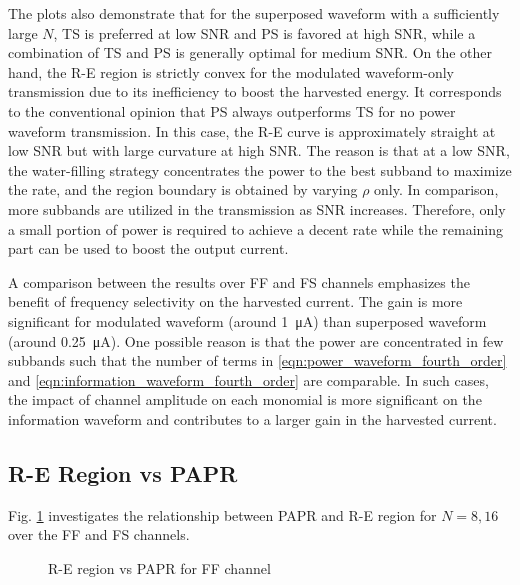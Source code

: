The plots also demonstrate that for the superposed waveform with a sufficiently large $N$, TS is preferred at low SNR and PS is favored at high SNR, while a combination of TS and PS is generally optimal for medium SNR. On the other hand, the R-E region is strictly convex for the modulated waveform-only transmission due to its inefficiency to boost the harvested energy. It corresponds to the conventional opinion that PS always outperforms TS for no power waveform transmission. In this case, the R-E curve is approximately straight at low SNR but with large curvature at high SNR. The reason is that at a low SNR, the water-filling strategy concentrates the power to the best subband to maximize the rate, and the region boundary is obtained by varying $\rho $ only. In comparison, more subbands are utilized in the transmission as SNR increases. Therefore, only a small portion of power is required to achieve a decent rate while the remaining part can be used to boost the output current.

A comparison between the results over FF and FS channels emphasizes the benefit of frequency selectivity on the harvested current. The gain is more significant for modulated waveform (around \SI{1}{\uA}) than superposed waveform (around \SI{0.25}{\uA}). One possible reason is that the power are concentrated in few subbands such that the number of terms in \eqref{eqn:power_waveform_fourth_order} and \eqref{eqn:information_waveform_fourth_order} are comparable. In such cases, the impact of channel amplitude on each monomial is more significant on the information waveform and contributes to a larger gain in the harvested current.



\subsection{R-E Region vs PAPR}\label{sec:re-region-vs-papr}
Fig. \ref{fig:re-papr} investigates the relationship between PAPR and R-E region for $N = 8, 16$ over the FF and FS channels.

\begin{figure}[ht]
  \centering
  \quad
  \caption{R-E region vs PAPR for FF channel}
  \label{fig:re-papr}
\end{figure}

